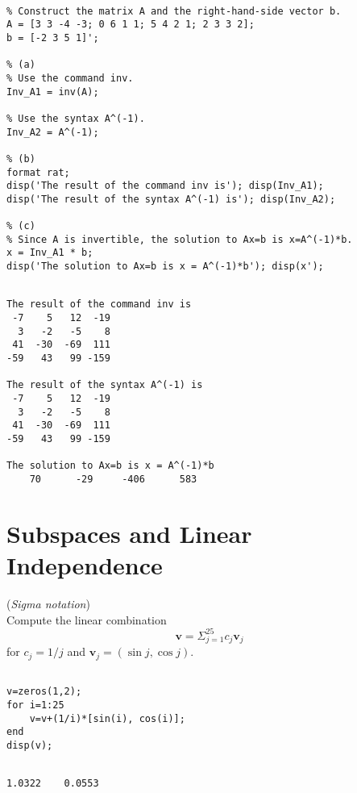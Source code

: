 \begin{sol}

\begin{verbatim}

% Construct the matrix A and the right-hand-side vector b.
A = [3 3 -4 -3; 0 6 1 1; 5 4 2 1; 2 3 3 2]; 
b = [-2 3 5 1]'; 

% (a)
% Use the command inv.
Inv_A1 = inv(A); 

% Use the syntax A^(-1).
Inv_A2 = A^(-1); 

% (b)
format rat; 
disp('The result of the command inv is'); disp(Inv_A1);
disp('The result of the syntax A^(-1) is'); disp(Inv_A2);

% (c)
% Since A is invertible, the solution to Ax=b is x=A^(-1)*b.
x = Inv_A1 * b;
disp('The solution to Ax=b is x = A^(-1)*b'); disp(x');
\end{verbatim}

\begin{outputs}

\begin{verbatim}

The result of the command inv is
 -7    5   12  -19
  3   -2   -5    8
 41  -30  -69  111
-59   43   99 -159

The result of the syntax A^(-1) is
 -7    5   12  -19
  3   -2   -5    8
 41  -30  -69  111
-59   43   99 -159

The solution to Ax=b is x = A^(-1)*b
    70      -29     -406      583
\end{verbatim}
\end{outputs}
\end{sol}



\section{Subspaces and Linear Independence}


\begin{exer} (\textit{Sigma notation})\\
Compute the linear combination 
$$\mathbf{v}=\Sigma_{j=1}^{25} c_{j}\mathbf{v}_{j}$$
for $c_{j}=1/j$ and $\mathbf{v}_{j}=(\sin j, \cos j).$

\end{exer}



\begin{sol}
\begin{verbatim}

v=zeros(1,2);
for i=1:25
    v=v+(1/i)*[sin(i), cos(i)];
end
disp(v);
\end{verbatim}



\begin{outputs}
\begin{verbatim}

1.0322    0.0553
\end{verbatim}
\end{outputs}
\end{sol}

